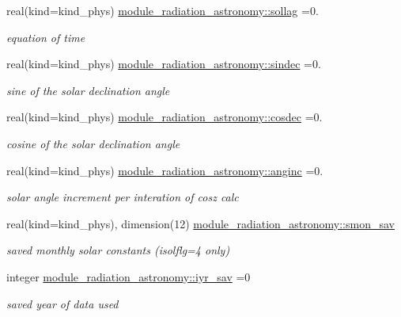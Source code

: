 \begin{DoxyCompactItemize}
\item 
real(kind=kind\+\_\+phys) \hyperlink{group__module__radiation__astronomy_ga264a011aa71fb670339ac555dc24e486}{module\+\_\+radiation\+\_\+astronomy\+::sollag} =0.
\begin{DoxyCompactList}\small\item\em equation of time \end{DoxyCompactList}\item 
real(kind=kind\+\_\+phys) \hyperlink{group__module__radiation__astronomy_gae195d9c834e2789170f89c988d28b01e}{module\+\_\+radiation\+\_\+astronomy\+::sindec} =0.
\begin{DoxyCompactList}\small\item\em sine of the solar declination angle \end{DoxyCompactList}\item 
real(kind=kind\+\_\+phys) \hyperlink{group__module__radiation__astronomy_ga07386e90045639b8023abd826e0e2768}{module\+\_\+radiation\+\_\+astronomy\+::cosdec} =0.
\begin{DoxyCompactList}\small\item\em cosine of the solar declination angle \end{DoxyCompactList}\item 
real(kind=kind\+\_\+phys) \hyperlink{group__module__radiation__astronomy_ga723159a44491e4ae974128123a1e8dcd}{module\+\_\+radiation\+\_\+astronomy\+::anginc} =0.
\begin{DoxyCompactList}\small\item\em solar angle increment per interation of cosz calc \end{DoxyCompactList}\item 
real(kind=kind\+\_\+phys), dimension(12) \hyperlink{group__module__radiation__astronomy_gab68b4488022a4c6340cb60dca3feff6a}{module\+\_\+radiation\+\_\+astronomy\+::smon\+\_\+sav}
\begin{DoxyCompactList}\small\item\em saved monthly solar constants (isolflg=4 only) \end{DoxyCompactList}\item 
integer \hyperlink{group__module__radiation__astronomy_ga83370fbee96388e545a89eb25ed6df90}{module\+\_\+radiation\+\_\+astronomy\+::iyr\+\_\+sav} =0
\begin{DoxyCompactList}\small\item\em saved year of data used \end{DoxyCompactList}\item 

\end{DoxyCompactItemize}
